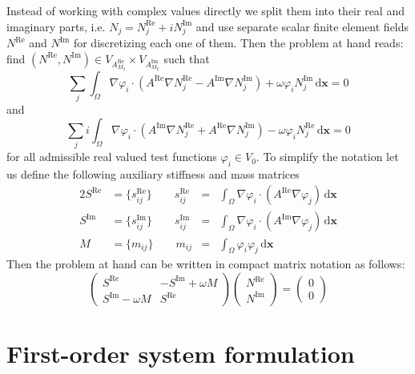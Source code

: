 \documentclass[11pt,a4paper]{article}
\begin{document}
Instead of working with complex values directly we split them into their real and imaginary parts, i.e. $N_j=N_j^\mathrm{Re}+iN_j^\mathrm{Im}$ and use separate scalar finite element fields $N^\mathrm{Re}$ and $N^\mathrm{Im}$ for discretizing each one of them. Then the problem at hand reads: find $(N^\mathrm{Re},N^\mathrm{Im})\in V_{A_{M_2}^\mathrm{Re}}\times V_{A_{M_2}^\mathrm{Im}}$ such that
\begin{equation}
\sum_j\int_\Omega \nabla\varphi_i\cdot\left(A^\mathrm{Re}\nabla N_j^\mathrm{Re}-A^\mathrm{Im}\nabla N_j^\mathrm{Im}\right)+\omega \varphi_i N_j^\mathrm{Im}\,\mathrm{d}\mathbf{x}=0
\end{equation}
and
\begin{equation}
\sum_ji\int_\Omega \nabla\varphi_i\cdot\left(A^\mathrm{Im}\nabla N_j^\mathrm{Re}+A^\mathrm{Re}\nabla N_j^\mathrm{Im}\right)-\omega \varphi_i N_j^\mathrm{Re}\,\mathrm{d}\mathbf{x}=0
\end{equation}
for all admissible real valued test functions $\varphi_i\in V_{0}$.
To simplify the notation let us define the following auxiliary stiffness and mass matrices
\begin{alignat}{2}
S^\mathrm{Re}&=\{s_{ij}^\mathrm{Re}\} \qquad s_{ij}^\mathrm{Re}&=&\int_\Omega \nabla\varphi_i\cdot(A^\mathrm{Re}\nabla\varphi_j)\,\mathrm{d}\mathbf{x}\\
S^\mathrm{Im}&=\{s_{ij}^\mathrm{Im}\} \qquad s_{ij}^\mathrm{Im}&=&\int_\Omega \nabla\varphi_i\cdot(A^\mathrm{Im}\nabla\varphi_j)\,\mathrm{d}\mathbf{x}\\
M&=\{m_{ij}\} \qquad m_{ij}&=&\int_\Omega \varphi_i\varphi_j\,\mathrm{d}\mathbf{x}
\end{alignat}
Then the problem at hand can be written in compact matrix notation as follows:
\begin{equation}
\begin{pmatrix}
S^\mathrm{Re} & -S^\mathrm{Im}+\omega M\\
S^\mathrm{Im}-\omega M &  S^\mathrm{Re}
\end{pmatrix}
\begin{pmatrix}
N^\mathrm{Re}\\
N^\mathrm{Im}
\end{pmatrix}
=
\begin{pmatrix}
0\\
0
\end{pmatrix}
\end{equation}

\section{First-order system formulation}
\end{document}

